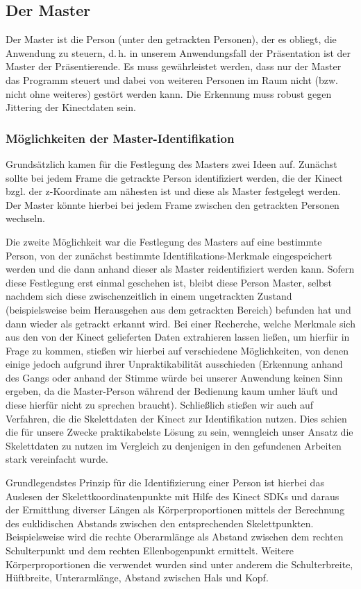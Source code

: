 \subsection{Der Master}
	Der Master ist die Person (unter den getrackten Personen), der es obliegt, die Anwendung zu steuern, d.\,h. in unserem Anwendungsfall der Präsentation ist der Master der Präsentierende.
	Es muss gewährleistet werden, dass nur der Master das Programm steuert und dabei von weiteren Personen im Raum nicht (bzw. nicht ohne weiteres) gestört werden kann. Die Erkennung muss robust gegen Jittering der Kinectdaten sein.\par
\subsubsection{Möglichkeiten der Master-Identifikation}
	Grundsätzlich kamen für die Festlegung des Masters zwei Ideen auf. Zunächst sollte bei jedem Frame die getrackte Person identifiziert werden, die der Kinect bzgl. der z-Koordinate am nähesten ist und diese als Master festgelegt werden. Der Master könnte hierbei bei jedem Frame zwischen den getrackten Personen wechseln. \par
	Die zweite Möglichkeit war die Festlegung des Masters auf eine bestimmte Person, von der zunächst bestimmte Identifikations-Merkmale eingespeichert werden und die dann anhand dieser als Master reidentifiziert werden kann. Sofern diese Festlegung erst einmal geschehen ist, bleibt diese Person Master, selbst nachdem sich diese zwischenzeitlich in einem ungetrackten Zustand (beispielsweise beim Herausgehen aus dem getrackten Bereich) befunden hat und dann wieder als getrackt erkannt wird. Bei einer Recherche, welche Merkmale sich aus den von der Kinect gelieferten Daten extrahieren lassen ließen, um hierfür in Frage zu kommen, stießen wir hierbei auf verschiedene Möglichkeiten, von denen einige jedoch aufgrund ihrer Unpraktikabilität ausschieden (Erkennung anhand des Gangs oder anhand der Stimme würde bei unserer Anwendung keinen Sinn ergeben, da die Master-Person während der Bedienung kaum umher läuft und diese hierfür nicht zu sprechen braucht). Schließlich stießen wir auch auf Verfahren, die die Skelettdaten der Kinect zur Identifikation nutzen. Dies schien die für unsere Zwecke praktikabelste Lösung zu sein, wenngleich unser Ansatz die Skelettdaten zu nutzen im Vergleich zu denjenigen in den gefundenen Arbeiten stark vereinfacht wurde.\par
	Grundlegendstes Prinzip für die Identifizierung einer Person ist hierbei das Auslesen der Skelettkoordinatenpunkte mit Hilfe des Kinect SDKs und daraus der Ermittlung diverser Längen als Körperproportionen mittels der Berechnung des euklidischen Abstands zwischen den entsprechenden Skelettpunkten. Beispielsweise wird die rechte Oberarmlänge als Abstand zwischen dem rechten Schulterpunkt und dem rechten Ellenbogenpunkt ermittelt. Weitere Körperproportionen die verwendet wurden sind unter anderem die Schulterbreite, Hüftbreite, Unterarmlänge, Abstand zwischen Hals und Kopf. \par

